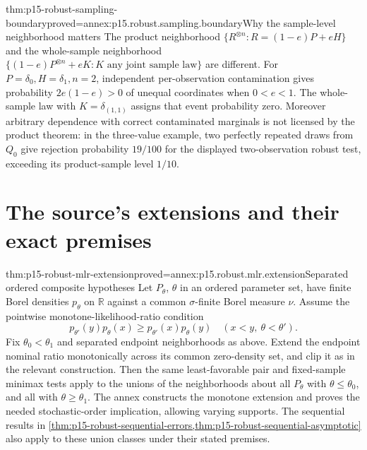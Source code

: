 \begin{hbtheorem}{thm:p15-robust-sampling-boundary}{proved=annex:p15.robust.sampling.boundary}{Why the sample-level neighborhood matters}
The product neighborhood
\(\{R^{\otimes n}:R=(1-e)P+eH\}\) and the whole-sample neighborhood
\(\{(1-e)P^{\otimes n}+eK:K\text{ any joint sample law}\}\) are different.
For \(P=\delta_0,H=\delta_1,n=2\), independent per-observation
contamination gives probability \(2e(1-e)>0\) of unequal coordinates
when \(0<e<1\). The whole-sample law with \(K=\delta_{(1,1)}\)
assigns that event probability zero.
Moreover arbitrary dependence with correct contaminated marginals
is not licensed by the product theorem: in the three-value example,
two perfectly repeated draws from \(Q_0\) give rejection probability
\(19/100\) for the displayed two-observation robust test, exceeding
its product-sample level \(1/10\).
\end{hbtheorem}

\section{The source's extensions and their exact premises}
\label{sec:p15-robust-source-extensions}

\begin{hbtheorem}{thm:p15-robust-mlr-extension}{proved=annex:p15.robust.mlr.extension}{Separated ordered composite hypotheses}
Let \(P_\theta\), \(\theta\) in an ordered parameter set, have finite
Borel densities \(p_\theta\) on \(\mathbb R\) against a common
\(\sigma\)-finite Borel measure \(\nu\). Assume the pointwise
monotone-likelihood-ratio condition
\[
 p_{\theta'}(y)p_\theta(x)\geq
 p_{\theta'}(x)p_\theta(y)
       \quad(x<y,\ \theta<\theta').
\]
Fix \(\theta_0<\theta_1\) and separated endpoint neighborhoods as above.
Extend the endpoint nominal ratio monotonically across its common
zero-density set, and clip it as in the relevant construction.
Then the same least-favorable pair and fixed-sample minimax tests apply
to the unions of the neighborhoods about all \(P_\theta\) with
\(\theta\leq\theta_0\), and all with \(\theta\geq\theta_1\).
The annex constructs the monotone extension and proves the needed
stochastic-order implication, allowing varying supports.
The sequential results in
\cref{thm:p15-robust-sequential-errors,thm:p15-robust-sequential-asymptotic}
also apply to these union classes under their stated premises.
\end{hbtheorem}

